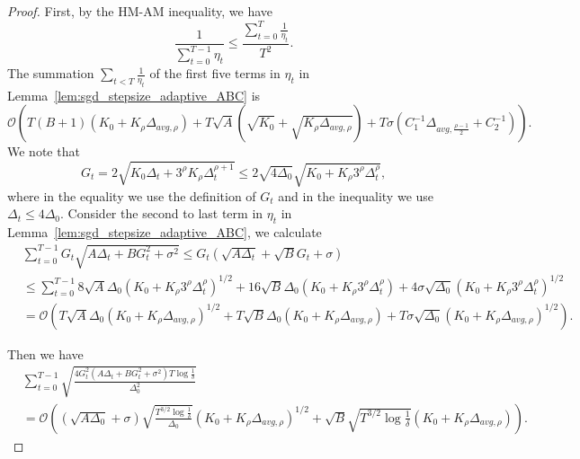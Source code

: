 \documentclass[10pt,a4paper]{amsart}
\newcommand{\Kr}{K_{\rho}}
\newcommand{\paren}[1]{\left( #1 \right)}
\begin{document}
\begin{proof}
     First, by the HM-AM inequality, we have
    \begin{equation}\label{eq:adaptive_a.s.ABC_HM-AM}
        \frac{1}{\sum_{t=0}^{T-1}\eta_t}\leq \frac{\sum_{t=0}^T \frac{1}{\eta_t}}{T^2}.
    \end{equation}
    The summation $\sum_{t<T}\frac{1}{\eta_t}$ of the first five terms in $\eta_t$ in Lemma~\ref{lem:sgd_stepsize_adaptive_ABC} is $$\mathcal{O}\paren{T(B+1)\paren{K_0+\Kr\Delta_{avg,\rho}}+T\sqrt{A}\paren{\sqrt{K_0}+\sqrt{\Kr\Delta_{avg,\rho}}}+T\sigma\paren{C_1^{-1}\Delta_{avg,\frac{\rho-1}{2}}+C_2^{-1}}}.$$
    We note that 
    $$G_t=2\sqrt{K_0\Delta_t+3^\rho\Kr\Delta_t^{\rho+1}}\leq 
    2\sqrt{4\Delta_0}\sqrt{K_0+\Kr 3^\rho\Delta_t^{\rho}},$$
    where in the equality we use the definition of $G_t$ and in the inequality we use $\Delta_t\leq 4\Delta_0$. 
    Consider the second to last term in $\eta_t$ in Lemma~\ref{lem:sgd_stepsize_adaptive_ABC}, we calculate
    \begin{align*}
        &\sum_{t=0}^{T-1}G_t\sqrt{A\Delta_t+BG_t^2+\sigma^2}\leq G_t\paren{\sqrt{A\Delta_t}+\sqrt{B}G_t+\sigma}\\
        &\leq \sum_{t=0}^{T-1} 8\sqrt{A}\Delta_0\paren{K_0+\Kr3^\rho\Delta_t^\rho}^{1/2}
        +16\sqrt{B}\Delta_0\paren{K_0+\Kr3^\rho\Delta_t^\rho}+4\sigma\sqrt{\Delta_0}\paren{K_0+\Kr3^\rho\Delta_t^\rho}^{1/2}\\
        &=\mathcal{O}\paren{T\sqrt{A}\Delta_0\paren{K_0+\Kr\Delta_{avg,\rho}}^{1/2}+T\sqrt{B}\Delta_0\paren{K_0+\Kr\Delta_{avg,\rho}}+T\sigma\sqrt{\Delta_0}\paren{K_0+\Kr\Delta_{avg,\rho}}^{1/2}}.
    \end{align*}

    Then we have
    \begin{align*}
        &\sum_{t=0}^{T-1}\sqrt{\frac{4G_t^2\paren{A\Delta_t+BG_t^2+\sigma^2}T\log\frac{1}{\delta}}{\Delta_0^2}}\\
        &=\mathcal{O}\paren{\paren{\sqrt{A\Delta_0}+\sigma}\sqrt{\frac{T^{3/2}\log\frac{1}{\delta}}{\Delta_0}}\paren{K_0+\Kr\Delta_{avg,\rho}}^{1/2}+\sqrt{B}\sqrt{T^{3/2}\log\frac{1}{\delta}}\paren{K_0+\Kr\Delta_{avg,\rho}}}.
    \end{align*}


\end{proof}
\end{document}

